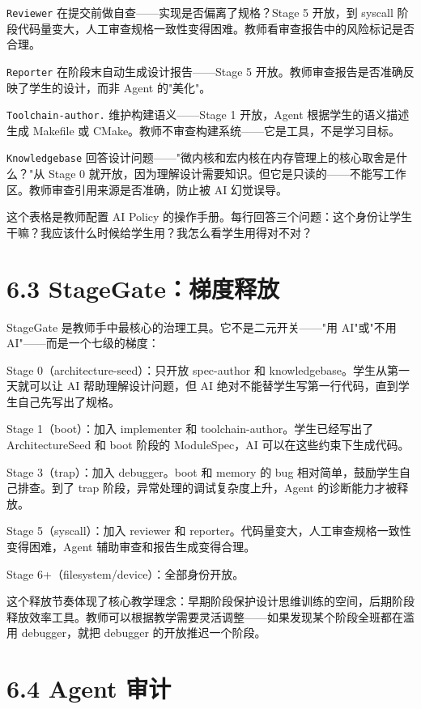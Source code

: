 \documentclass[UTF8,a4paper,12pt,openany]{ctexrep}
\newcommand{\passthrough}[1]{#1}
\begin{document}
\passthrough{\lstinline!Reviewer!} 在提交前做自查------实现是否偏离了规格？Stage 5 开放，到 syscall 阶段代码量变大，人工审查规格一致性变得困难。教师看审查报告中的风险标记是否合理。

\passthrough{\lstinline!Reporter!} 在阶段末自动生成设计报告------Stage 5 开放。教师审查报告是否准确反映了学生的设计，而非 Agent 的"美化"。

\passthrough{\lstinline!Toolchain-author.!} 维护构建语义------Stage 1 开放，Agent 根据学生的语义描述生成 Makefile 或 CMake。教师不审查构建系统------它是工具，不是学习目标。

\passthrough{\lstinline!Knowledgebase!} 回答设计问题------"微内核和宏内核在内存管理上的核心取舍是什么？"从 Stage 0 就开放，因为理解设计需要知识。但它是只读的------不能写工作区。教师审查引用来源是否准确，防止被 AI 幻觉误导。

这个表格是教师配置 AI Policy 的操作手册。每行回答三个问题：这个身份让学生干嘛？我应该什么时候给学生用？我怎么看学生用得对不对？

\section{6.3 StageGate：梯度释放}\label{63-stagegateux68afux5ea6ux91caux653e}

StageGate 是教师手中最核心的治理工具。它不是二元开关------"用 AI"或"不用 AI"------而是一个七级的梯度：

Stage 0（architecture-seed）：只开放 spec-author 和 knowledgebase。学生从第一天就可以让 AI 帮助理解设计问题，但 AI 绝对不能替学生写第一行代码，直到学生自己先写出了规格。

Stage 1（boot）：加入 implementer 和 toolchain-author。学生已经写出了 ArchitectureSeed 和 boot 阶段的 ModuleSpec，AI 可以在这些约束下生成代码。

Stage 3（trap）：加入 debugger。boot 和 memory 的 bug 相对简单，鼓励学生自己排查。到了 trap 阶段，异常处理的调试复杂度上升，Agent 的诊断能力才被释放。

Stage 5（syscall）：加入 reviewer 和 reporter。代码量变大，人工审查规格一致性变得困难，Agent 辅助审查和报告生成变得合理。

Stage 6+（filesystem/device）：全部身份开放。

这个释放节奏体现了核心教学理念：早期阶段保护设计思维训练的空间，后期阶段释放效率工具。教师可以根据教学需要灵活调整------如果发现某个阶段全班都在滥用 debugger，就把 debugger 的开放推迟一个阶段。

\section{6.4 Agent 审计}\label{64-agent-ux5ba1ux8ba1}
\end{document}
